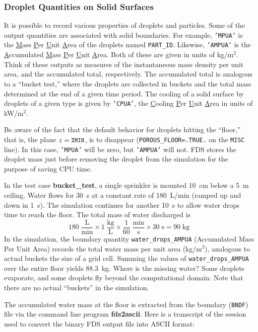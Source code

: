\documentclass[11pt]{book}
\newcommand{\ct}{\tt\small}
\newcommand{\be}{\begin{equation}}
\newcommand{\ee}{\end{equation}}
\begin{document}
\subsubsection{Droplet Quantities on Solid Surfaces}

It is possible to record various properties of droplets and particles. Some of the output quantities are associated with solid boundaries. For example,
{\ct 'MPUA'} is the \underline{M}ass \underline{P}er \underline{U}nit \underline{A}rea of the droplets named {\ct PART\_ID}.
Likewise, {\ct 'AMPUA'} is the \underline{A}ccumulated \underline{M}ass \underline{P}er \underline{U}nit \underline{A}rea.
Both of these are given in units of kg/m$^2$. Think of these outputs as measures of the instantaneous mass density per unit area,
and the accumulated total, respectively. The accumulated total is analogous to a ``bucket test,'' where the droplets are collected
in buckets and the total mass determined at the end of a given time period. The cooling of a solid surface by droplets of a
given type is given by {\ct 'CPUA'}, the \underline{C}ooling \underline{P}er \underline{U}nit \underline{A}rea in units of kW/m$^2$.

Be aware of the fact that the default behavior for droplets hitting the ``floor,'' that is, the plane $z=\hbox{\ct ZMIN}$,
is to disappear ({\ct POROUS\_FLOOR=.TRUE.} on the {\ct MISC} line).
In this case, {\ct 'MPUA'} will be zero, but {\ct 'AMPUA'} will not. FDS stores the droplet mass just before removing the droplet from
the simulation for the purpose of saving CPU time.

In the test case {\bf bucket\_test}, a single sprinkler is
mounted 10~cm below a 5~m ceiling. Water flows for 30~s at a constant
rate of 180~L/min (ramped up and down in 1~s).  The simulation continues for another 10~s to allow
water drops time to reach the floor. The total mass of water discharged is
\be
  \mathrm{ 180 \; \frac{L}{min} \times 1 \; \frac{kg}{L} \times \frac{1}{60} \; \frac{min}{s} \times 30 \; s = 90 \; kg }
\ee
In the simulation, the boundary quantity {\ct water\_drops\_AMPUA}
(Accumulated Mass Per Unit Area) records the total water mass per
unit area (kg/m$^2$), analogous to actual buckets the size of a grid cell.
Summing the values of {\ct water\_drops\_AMPUA} over the entire
floor yields 88.3~kg. Where is the missing water? Some droplets evaporate, and some droplets
fly beyond the computational domain. Note that
there are no actual ``buckets'' in the simulation.

The accumulated water mass at the floor is extracted from
the boundary ({\ct BNDF}) file via the command line program
{\bf fds2ascii}. Here is a transcript of the session
used to convert the binary FDS output file into ASCII format:
\end{document}
